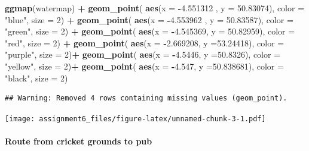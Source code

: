 \documentclass[]{article}
\newenvironment{Shaded}{\begin{snugshade}}{\end{snugshade}}
\newcommand{\KeywordTok}[1]{\textcolor[rgb]{0.13,0.29,0.53}{\textbf{#1}}}
\newcommand{\DataTypeTok}[1]{\textcolor[rgb]{0.13,0.29,0.53}{#1}}
\newcommand{\DecValTok}[1]{\textcolor[rgb]{0.00,0.00,0.81}{#1}}
\newcommand{\FloatTok}[1]{\textcolor[rgb]{0.00,0.00,0.81}{#1}}
\newcommand{\StringTok}[1]{\textcolor[rgb]{0.31,0.60,0.02}{#1}}
\newcommand{\OperatorTok}[1]{\textcolor[rgb]{0.81,0.36,0.00}{\textbf{#1}}}
\newcommand{\NormalTok}[1]{#1}
\let\oldparagraph\paragraph
\renewcommand{\paragraph}[1]{\oldparagraph{#1}\mbox{}}
\begin{document}
\begin{Shaded}
\begin{Highlighting}[]
\KeywordTok{ggmap}\NormalTok{(watermap) }\OperatorTok{+}
\StringTok{  }\KeywordTok{geom_point}\NormalTok{(}
    \KeywordTok{aes}\NormalTok{(}\DataTypeTok{x =} \OperatorTok{-}\FloatTok{4.551312}\NormalTok{ , }\DataTypeTok{y =} \FloatTok{50.83074}\NormalTok{),}
    \DataTypeTok{color =} \StringTok{"blue"}\NormalTok{, }\DataTypeTok{size =} \DecValTok{2}\NormalTok{) }\OperatorTok{+}
\StringTok{  }\KeywordTok{geom_point}\NormalTok{(}
    \KeywordTok{aes}\NormalTok{(}\DataTypeTok{x =} \OperatorTok{-}\FloatTok{4.553962}\NormalTok{ , }\DataTypeTok{y =} \FloatTok{50.83587}\NormalTok{),}
    \DataTypeTok{color =} \StringTok{"green"}\NormalTok{, }\DataTypeTok{size =} \DecValTok{2}\NormalTok{) }\OperatorTok{+}
\StringTok{  }\KeywordTok{geom_point}\NormalTok{(}
    \KeywordTok{aes}\NormalTok{(}\DataTypeTok{x =} \OperatorTok{-}\FloatTok{4.545369}\NormalTok{, }\DataTypeTok{y =} \FloatTok{50.82959}\NormalTok{),}
    \DataTypeTok{color =} \StringTok{"red"}\NormalTok{, }\DataTypeTok{size =} \DecValTok{2}\NormalTok{) }\OperatorTok{+}
\StringTok{  }\KeywordTok{geom_point}\NormalTok{(}
    \KeywordTok{aes}\NormalTok{(}\DataTypeTok{x =} \OperatorTok{-}\FloatTok{2.669208}\NormalTok{, }\DataTypeTok{y =}\FloatTok{53.24418}\NormalTok{),}
    \DataTypeTok{color =} \StringTok{"purple"}\NormalTok{, }\DataTypeTok{size =} \DecValTok{2}\NormalTok{)}\OperatorTok{+}
\StringTok{  }\KeywordTok{geom_point}\NormalTok{(}
    \KeywordTok{aes}\NormalTok{(}\DataTypeTok{x =} \OperatorTok{-}\FloatTok{4.5446}\NormalTok{, }\DataTypeTok{y =}\FloatTok{50.8326}\NormalTok{),}
    \DataTypeTok{color =} \StringTok{"yellow"}\NormalTok{, }\DataTypeTok{size =} \DecValTok{2}\NormalTok{)}\OperatorTok{+}
\StringTok{  }\KeywordTok{geom_point}\NormalTok{(}
    \KeywordTok{aes}\NormalTok{(}\DataTypeTok{x =} \OperatorTok{-}\FloatTok{4.547}\NormalTok{, }\DataTypeTok{y =}\FloatTok{50.838681}\NormalTok{),}
    \DataTypeTok{color =} \StringTok{"black"}\NormalTok{, }\DataTypeTok{size =} \DecValTok{2}\NormalTok{)}
\end{Highlighting}
\end{Shaded}

\begin{verbatim}
## Warning: Removed 4 rows containing missing values (geom_point).
\end{verbatim}

\texttt{[image: assignment6\_files/figure-latex/unnamed-chunk-3-1.pdf]}

\paragraph{Route from cricket grounds to
pub}\label{route-from-cricket-grounds-to-pub}
\end{document}
